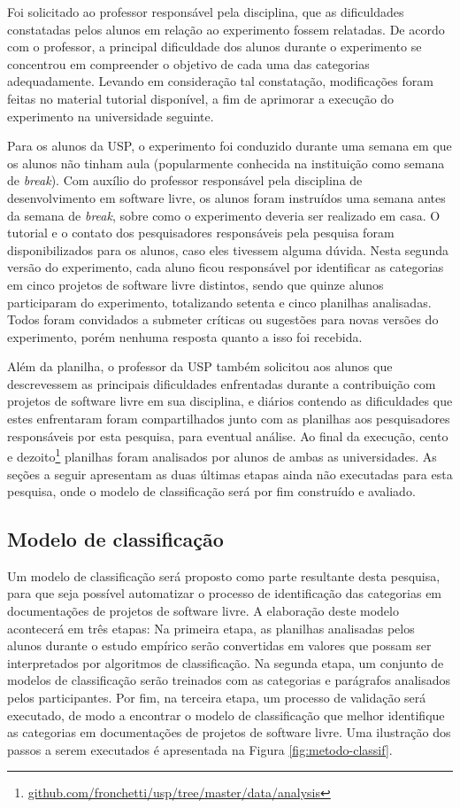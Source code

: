 Foi solicitado ao professor responsável pela disciplina, que as dificuldades constatadas pelos alunos em relação ao experimento fossem relatadas. De acordo com o professor, a principal dificuldade dos alunos durante o experimento se concentrou em compreender o objetivo de cada uma das categorias adequadamente. Levando em consideração tal constatação, modificações foram feitas no material tutorial disponível, a fim de aprimorar a execução do experimento na universidade seguinte.

Para os alunos da USP, o experimento foi conduzido durante uma semana em que os alunos não tinham aula (popularmente conhecida na instituição como semana de \textit{break}). Com auxílio do professor responsável pela disciplina de desenvolvimento em software livre, os alunos foram instruídos uma semana antes da semana de \textit{break}, sobre como o experimento deveria ser realizado em casa. O tutorial e o contato dos pesquisadores responsáveis pela pesquisa foram disponibilizados para os alunos, caso eles tivessem alguma dúvida. Nesta segunda versão do experimento, cada aluno ficou responsável por identificar as categorias em cinco projetos de software livre distintos, sendo que quinze alunos participaram do experimento, totalizando setenta e cinco planilhas analisadas. Todos foram convidados a submeter críticas ou sugestões para novas versões do experimento, porém nenhuma resposta quanto a isso foi recebida.

Além da planilha, o professor da USP também solicitou aos alunos que descrevessem as principais dificuldades enfrentadas durante a contribuição com projetos de software livre em sua disciplina, e diários contendo as dificuldades que estes enfrentaram foram compartilhados junto com as planilhas aos pesquisadores responsáveis por esta pesquisa, para eventual análise. Ao final da execução, cento e dezoito\footnote{\url{github.com/fronchetti/usp/tree/master/data/analysis}} planilhas foram analisados por alunos de ambas as universidades. As seções a seguir apresentam as duas últimas etapas ainda não executadas para esta pesquisa, onde o modelo de classificação será por fim construído e avaliado. 

\subsection{Modelo de classificação}
\label{sec:classificacao}
Um modelo de classificação será proposto como parte resultante desta pesquisa, para que seja possível automatizar o processo de identificação das categorias em documentações de projetos de software livre. A elaboração deste modelo acontecerá em três etapas: Na primeira etapa, as planilhas analisadas pelos alunos durante o estudo empírico serão convertidas em valores que possam ser interpretados por algoritmos de classificação. Na segunda etapa, um conjunto de modelos de classificação serão treinados com as categorias e parágrafos analisados pelos participantes. Por fim, na terceira etapa, um processo de validação será executado, de modo a encontrar o modelo de classificação que melhor identifique as categorias em documentações de projetos de software livre. Uma ilustração dos passos a serem executados é apresentada na Figura \ref{fig:metodo-classif}.


